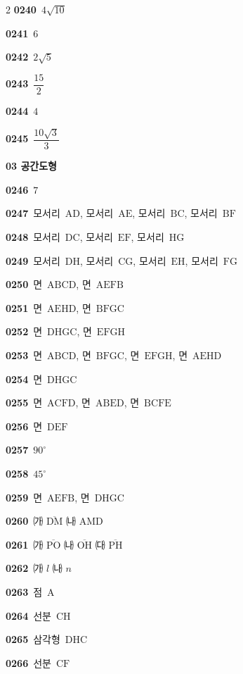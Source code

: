 \documentclass[10pt,a4paper]{article}
\newcommand{\pt}[1]{\mathrm{#1}}
\newcommand{\seg}[1]{\overline{\mathrm{#1}}}
\begin{document}
\begin{multicols}{2}
\noindent\textbf{0240}\ $4\sqrt{10}$\par
\noindent\textbf{0241}\ $6$\par
\noindent\textbf{0242}\ $2\sqrt{5}$\par
\noindent\textbf{0243}\ $\dfrac{15}{2}$\par
\noindent\textbf{0244}\ $4$\par
\noindent\textbf{0245}\ $\dfrac{10\sqrt{3}}{3}$\par
\noindent\textbf{03 공간도형}\par\smallskip
\noindent\textbf{0246}\ $7$\par
\noindent\textbf{0247}\ 모서리~$\pt{AD}$, 모서리~$\pt{AE}$, 모서리~$\pt{BC}$, 모서리~$\pt{BF}$\par
\noindent\textbf{0248}\ 모서리~$\pt{DC}$, 모서리~$\pt{EF}$, 모서리~$\pt{HG}$\par
\noindent\textbf{0249}\ 모서리~$\pt{DH}$, 모서리~$\pt{CG}$, 모서리~$\pt{EH}$, 모서리~$\pt{FG}$\par
\noindent\textbf{0250}\ 면~$\pt{ABCD}$, 면~$\pt{AEFB}$\par
\noindent\textbf{0251}\ 면~$\pt{AEHD}$, 면~$\pt{BFGC}$\par
\noindent\textbf{0252}\ 면~$\pt{DHGC}$, 면~$\pt{EFGH}$\par
\noindent\textbf{0253}\ 면~$\pt{ABCD}$, 면~$\pt{BFGC}$, 면~$\pt{EFGH}$, 면~$\pt{AEHD}$\par
\noindent\textbf{0254}\ 면~$\pt{DHGC}$\par
\noindent\textbf{0255}\ 면~$\pt{ACFD}$, 면~$\pt{ABED}$, 면~$\pt{BCFE}$\par
\noindent\textbf{0256}\ 면~$\pt{DEF}$\par
\noindent\textbf{0257}\ $90^\circ$\par
\noindent\textbf{0258}\ $45^\circ$\par
\noindent\textbf{0259}\ 면~$\pt{AEFB}$, 면~$\pt{DHGC}$\par
\noindent\textbf{0260}\ ㈎ $\seg{DM}$ ㈏ $\pt{AMD}$\par
\noindent\textbf{0261}\ ㈎ $\seg{PO}$ ㈏ $\seg{OH}$ ㈐ $\seg{PH}$\par
\noindent\textbf{0262}\ ㈎ $l$ ㈏ $n$\par
\noindent\textbf{0263}\ 점~$\pt{A}$\par
\noindent\textbf{0264}\ 선분~$\pt{CH}$\par
\noindent\textbf{0265}\ 삼각형~$\pt{DHC}$\par
\noindent\textbf{0266}\ 선분~$\pt{CF}$\par

\end{multicols}
\end{document}
